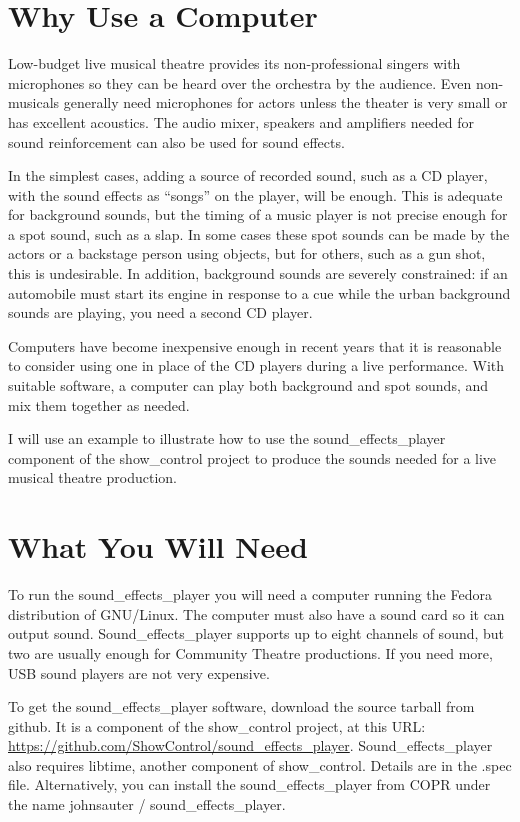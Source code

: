 \documentclass[letterpaper,twoside]{article}
\begin{document}
\section{Why Use a Computer}
Low-budget live musical theatre provides its non-professional singers
with microphones so they can be heard over the orchestra by the audience.
Even non-musicals generally need microphones for actors unless the
theater is very small or has excellent acoustics.
The audio mixer, speakers and amplifiers needed for
sound reinforcement can also be used for sound effects.

In the simplest cases, adding a source of recorded sound,
such as a CD player, with the sound effects as ``songs'' on the
player, will be enough.
This is adequate for background
sounds, but the timing of a music player is not precise enough
for a spot sound, such as a slap.
In some cases these spot sounds can be made by the actors
or a backstage person using objects, but for others, such as a gun
shot, this is undesirable.  In addition, background sounds are
severely constrained: if an automobile must start its engine
in response to a cue while the urban background sounds are playing,
you need a second CD player.

Computers have become inexpensive enough in recent years that it
is reasonable to consider using one in place of the CD players
during a live performance.  With suitable software, a computer
can play both background and spot sounds, and mix them together
as needed.

I will use an example to illustrate how to use the
sound\_effects\_player component
of the show\_control project to produce the sounds needed for
a live musical theatre production.

\section{What You Will Need}

To run the sound\_effects\_player you will need a computer running
the Fedora distribution of GNU/Linux.  The computer must also have
a sound card so it can output sound.  Sound\_effects\_player supports
up to eight channels of sound, but two are usually enough for Community
Theatre productions.  If you need more, USB sound players are not
very expensive.

To get the sound\_effects\_player software, download the source tarball
from github.  It is a component of the show\_control project, at this
URL: \url{https://github.com/ShowControl/sound\_effects\_player}.
Sound\_effects\_player also requires libtime, another component of
show\_control.  Details are in the {\ttfamily .spec} file.
Alternatively, you can install the sound\_effects\_player
from COPR under the name johnsauter / sound\_effects\_player.
\end{document}
